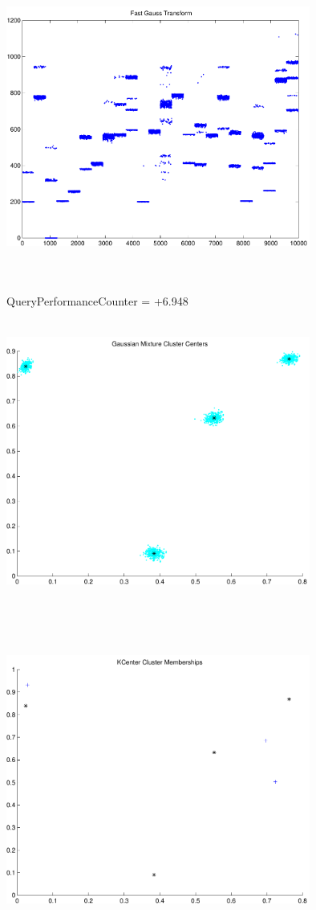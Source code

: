 \documentclass[9pt]{article}
\theoremstyle{plain}
\theoremstyle{definition}
\theoremstyle{remark}
\numberwithin{equation}{section}
\begin{document}
\includegraphics[width=10.0cm,height=10.0cm]{FGT24_Centers.pdf}

QueryPerformanceCounter  =  +6.948
\includegraphics[width=10.0cm,height=10.0cm]{GaussianMixture_ClusterCenters4_Centers.pdf}

\includegraphics[width=10.0cm,height=10.0cm]{KCenterClusterMemberships_4_Centers.pdf}
\end{document}
